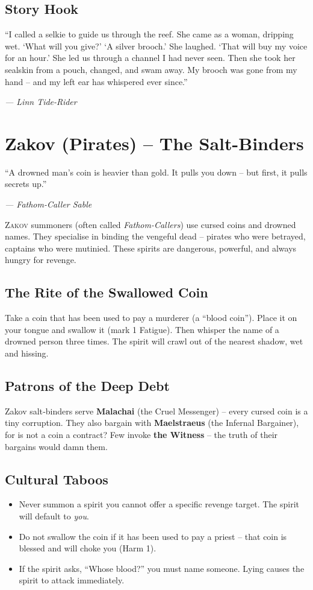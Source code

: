 \documentclass[10pt,a5paper]{book}
\begin{document}
\subsection*{Story Hook}
\epigraph{“I called a selkie to guide us through the reef. She came as a woman, dripping wet. ‘What will you give?’ ‘A silver brooch.’ She laughed. ‘That will buy my voice for an hour.’ She led us through a channel I had never seen. Then she took her sealskin from a pouch, changed, and swam away. My brooch was gone from my hand – and my left ear has whispered ever since.”}{\textit{— Linn Tide-Rider}}

\clearpage

\section{Zakov (Pirates) – The Salt-Binders}
\epigraph{“A drowned man’s coin is heavier than gold. It pulls you down – but first, it pulls secrets up.”}{\textit{— Fathom-Caller Sable}}

\lettrine{Z}{akov} summoners (often called \textit{Fathom-Callers}) use cursed coins and drowned names. They specialise in binding the vengeful dead – pirates who were betrayed, captains who were mutinied. These spirits are dangerous, powerful, and always hungry for revenge.

\subsection*{The Rite of the Swallowed Coin}
Take a coin that has been used to pay a murderer (a “blood coin”). Place it on your tongue and swallow it (mark 1 Fatigue). Then whisper the name of a drowned person three times. The spirit will crawl out of the nearest shadow, wet and hissing.

\subsection*{Patrons of the Deep Debt}
Zakov salt‑binders serve \textbf{Malachai} (the Cruel Messenger) – every cursed coin is a tiny corruption. They also bargain with \textbf{Maelstraeus} (the Infernal Bargainer), for is not a coin a contract? Few invoke \textbf{the Witness} – the truth of their bargains would damn them.

\subsection*{Cultural Taboos}
\begin{itemize}
    \item Never summon a spirit you cannot offer a specific revenge target. The spirit will default to \textit{you}.
    \item Do not swallow the coin if it has been used to pay a priest – that coin is blessed and will choke you (Harm 1).
    \item If the spirit asks, “Whose blood?” you must name someone. Lying causes the spirit to attack immediately.
\end{itemize}
\end{document}
